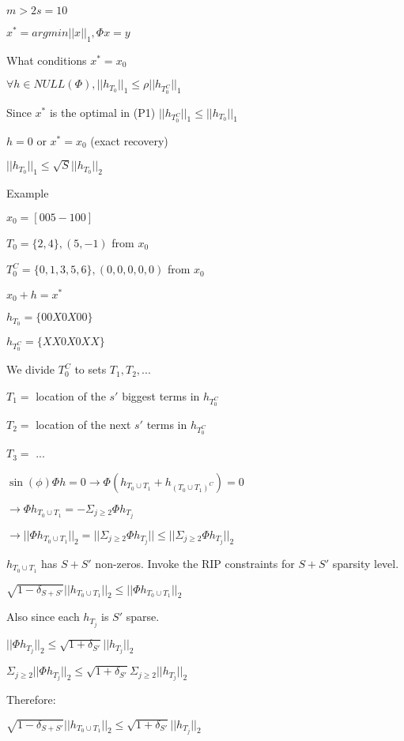 \documentclass[12pt,letterpaper]{report}
\begin{document}
$m > 2s = 10$

$x^* = argmin||x||_1, \Phi x = y$

What conditions $x^* = x_0$

$\forall h \in NULL(\Phi), ||h_{T_0}||_1 \leq \rho ||h_{T_0^C}||_1$

Since $x^*$ is the optimal in (P1) $||h_{T_0^C}||_1 \leq ||h_{T_0}||_1$

$h = 0$ or $x^* = x_0$ (exact recovery)

$||h_{T_0}||_1 \leq \sqrt{S} ||h_{T_0}||_2$

\vspace{1cm}
Example

$x_0 = [0 0 5 -1 0 0]$

$T_0 = \{2, 4\}, (5,-1)$ from $x_0$

$T_0^C = \{0, 1, 3, 5, 6 \}, (0,0,0,0,0)$ from $x_0$

$x_0 + h = x^*$

$h_{T_0} =   \{0 0 X 0 X 0 0\}$

$h_{T_0^C} = \{X X 0 X 0 X X\}$

We divide $T_0^C$ to sets $T_1, T_2, ...$

$T_1 = $ location of the $s'$ biggest terms in $h_{T_0^C}$

$T_2 = $ location of the next $s'$ terms in $h_{T_0^C}$

$T_3 = $ ...

$\sin(\phi) \Phi h = 0 \rightarrow \Phi (h_{T_0 \cup T_1} + h_{(T_0 \cup T_1)^C}) = 0$

$\rightarrow \Phi h_{T_0 \cup T_1} = - \Sigma_{j \geq 2} \Phi h_{T_j}$

$\rightarrow ||\Phi h_{T_0 \cup T_1}||_2 = ||\Sigma_{j \geq 2} \Phi h_{T_j}|| \leq ||\Sigma_{j \geq 2} \Phi h_{T_j}||_2$

$h_{T_0 \cup T_1}$ has $S + S'$ non-zeros.  Invoke the RIP constraints for $S + S'$ sparsity level.

$\sqrt{1 - \delta_{S+ S'}} ||h_{T_0 \cup T_1}||_2 \leq ||\Phi h_{T_0 \cup T_1}||_2$

Also since each $h_{T_j}$ is $S'$ sparse.

$||\Phi h_{T_j}||_2 \leq \sqrt{1 + \delta_{S'}} ||h_{T_j}||_2$

$\Sigma_{j \geq 2} ||\Phi h_{T_j}||_2 \leq \sqrt{1 + \delta_{S'}} \Sigma_{j \geq 2}  ||h_{T_j}||_2$

Therefore:

$\sqrt{1 - \delta_{S+S'}}  ||h_{T_0 \cup T_1}||_2 \leq
 \sqrt{1 + \delta_{S'}}  ||h_{T_j}||_2$
\end{document}
